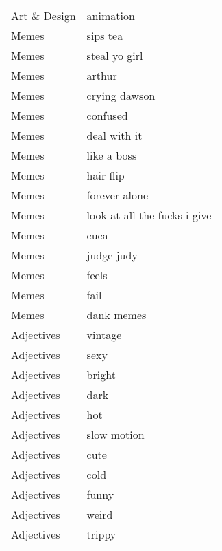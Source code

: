 \begin{supertabular}{l p{0.25\textwidth}}
     Art \& Design &                          animation \\
            Memes &                           sips tea \\
            Memes &                      steal yo girl \\
            Memes &                             arthur \\
            Memes &                      crying dawson \\
            Memes &                           confused \\
            Memes &                       deal with it \\
            Memes &                        like a boss \\
            Memes &                          hair flip \\
            Memes &                      forever alone \\
            Memes &       look at all the fucks i give \\
            Memes &                               cuca \\
            Memes &                         judge judy \\
            Memes &                              feels \\
            Memes &                               fail \\
            Memes &                         dank memes \\
       Adjectives &                            vintage \\
       Adjectives &                               sexy \\
       Adjectives &                             bright \\
       Adjectives &                               dark \\
       Adjectives &                                hot \\
       Adjectives &                        slow motion \\
       Adjectives &                               cute \\
       Adjectives &                               cold \\
       Adjectives &                              funny \\
       Adjectives &                              weird \\
       Adjectives &                             trippy \\

\end{supertabular}
